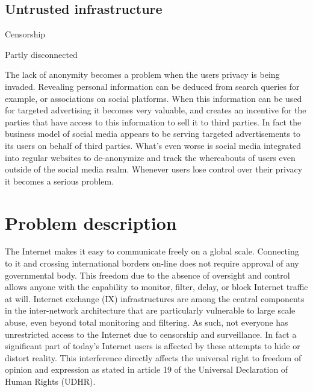 \section{Untrusted infrastructure}

Censorship

Partly disconnected

The lack of anonymity becomes a problem when the users privacy is being invaded.
Revealing personal information can be deduced from search queries for example, or associations on social platforms.
When this information can be used for targeted advertising it becomes very valuable, and creates an incentive for the parties that have access to this information to sell it to third parties.
In fact the business model of social media appears to be serving targeted advertisements to its users on behalf of third parties.
What's even worse is social media integrated into regular websites to de-anonymize and track the whereabouts of users even outside of the social media realm.
Whenever users lose control over their privacy it becomes a serious problem.


\chapter{Problem description}


The Internet makes it easy to communicate freely on a global scale.
Connecting to it and crossing international borders on-line does not require approval of any governmental body.
This freedom due to the absence of oversight and control allows anyone with the capability to monitor, filter, delay, or block Internet traffic at will.
Internet exchange (IX) infrastructures are among the central components in the inter-network architecture that are particularly vulnerable to large scale abuse, even beyond total monitoring and filtering.
As such, not everyone has unrestricted access to the Internet due to censorship and surveillance.
In fact a significant part of today's Internet users is affected by these attempts to hide or distort reality. %
This interference directly affects the universal right to freedom of opinion and expression as stated in article 19 of the Universal Declaration of Human Rights (UDHR).

